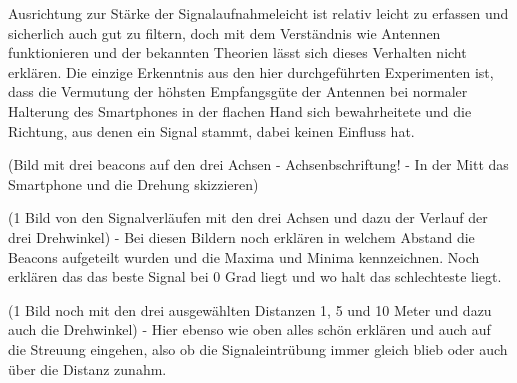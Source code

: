 Ausrichtung zur Stärke der Signalaufnahmeleicht ist relativ leicht zu erfassen und sicherlich auch gut zu filtern, doch mit dem Verständnis wie Antennen funktionieren und der bekannten Theorien lässt sich dieses Verhalten nicht erklären. Die einzige Erkenntnis aus den hier durchgeführten Experimenten ist, dass die Vermutung  der höhsten Empfangsgüte der Antennen bei normaler Halterung des Smartphones in der flachen Hand sich bewahrheitete und die Richtung, aus denen ein Signal stammt, dabei keinen Einfluss hat.

(Bild mit drei beacons auf den drei Achsen - Achsenbschriftung! - In der Mitt das Smartphone und die Drehung skizzieren)

(1 Bild von den Signalverläufen mit den drei Achsen und dazu der Verlauf der drei Drehwinkel) - Bei diesen Bildern noch erklären in welchem Abstand die Beacons aufgeteilt wurden und die Maxima und Minima kennzeichnen. Noch erklären das das beste Signal bei 0 Grad liegt und wo halt das schlechteste liegt.

(1 Bild noch mit den drei ausgewählten Distanzen 1, 5 und 10 Meter und dazu auch die Drehwinkel) - Hier ebenso wie oben alles schön erklären und auch auf die Streuung eingehen, also ob die Signaleintrübung immer gleich blieb oder auch über die Distanz zunahm.

